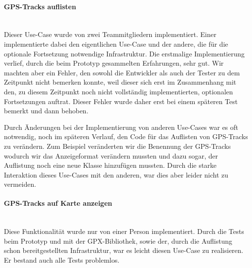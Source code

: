 \documentclass[10pt]{article}
\begin{document}
\paragraph{GPS-Tracks auflisten} \quad\\
Dieser Use-Case wurde von zwei Teammitgliedern implementiert. Einer implementierte dabei den eigentlichen 
Use-Case und der andere, die für die optionale Fortsetzung notwendige Infrastruktur. 
Die erstmalige Implementierung verlief, durch die beim Prototyp gesammelten Erfahrungen, sehr gut. 
Wir machten aber ein Fehler, den sowohl die Entwickler als auch der Tester zu dem Zeitpunkt nicht bemerken konnte, 
weil dieser sich erst im Zusammenhang mit den, zu diesem Zeitpunkt noch nicht vollständig implementierten, optionalen 
Fortsetzungen auftrat. Dieser Fehler wurde daher erst bei einem späteren Test bemerkt und dann behoben.\par 
\medskip
Durch Änderungen bei der Implementierung von anderen Use-Cases war es oft notwendig, noch im späteren Verlauf,
den Code für das Auflisten von GPS-Tracks zu verändern. Zum Beispiel veränderten wir die Benennung der GPS-Tracks
wodurch wir das Anzeigeformat verändern mussten und dazu sogar, der Auflistung noch eine neue Klasse hinzufügen mussten.
Durch die starke Interaktion dieses Use-Cases mit den anderen, war dies aber leider nicht zu vermeiden.

\paragraph{GPS-Tracks auf Karte anzeigen} \quad\\
Diese Funktionalität wurde nur von einer Person implementiert. Durch die Tests beim Prototyp und mit der GPX-Bibliothek,
sowie der, durch die Auflistung schon bereitgestellten Infrastruktur, war es leicht diesen Use-Case zu realisieren.
Er bestand auch alle Tests problemlos.
\end{document}
